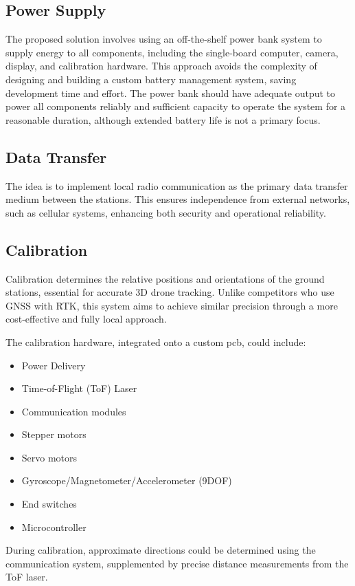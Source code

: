 \subsection{Power Supply}
The proposed solution involves using an off-the-shelf power bank system to supply energy to all components, including the single-board computer, camera, display, and calibration hardware. This approach avoids the complexity of designing and building a custom battery management system, saving development time and effort. The power bank should have adequate output to power all components reliably and sufficient capacity to operate the system for a reasonable duration, although extended battery life is not a primary focus.

\subsection{Data Transfer}
The idea is to implement local radio communication as the primary data transfer medium between the stations. This ensures independence from external networks, such as cellular systems, enhancing both security and operational reliability.

\subsection{Calibration}
Calibration determines the relative positions and orientations of the ground stations, essential for accurate 3D drone tracking. Unlike competitors who use GNSS with RTK, this system aims to achieve similar precision through a more cost-effective and fully local approach. 

The calibration hardware, integrated onto a custom \acrfull{pcb}, could include:
\begin{itemize}
	\item Power Delivery
	\item Time-of-Flight (ToF) Laser
	\item Communication modules
	\item Stepper motors
	\item Servo motors
	\item Gyroscope/Magnetometer/Accelerometer (9DOF)
	\item End switches
	\item Microcontroller
\end{itemize}

During calibration, approximate directions could be determined using the communication system, supplemented by precise distance measurements from the ToF laser.


